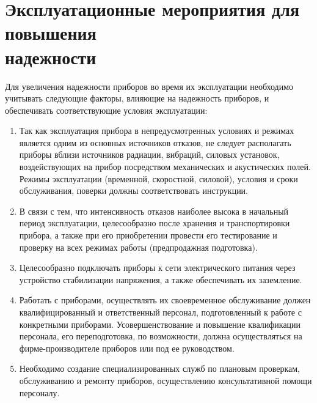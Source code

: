 \section[Эксплуатационные мероприятия для повышения надежности]{Эксплуатационные мероприятия для повышения \\надежности}
Для увеличения надежности приборов во время их эксплуатации необходимо учитывать следующие факторы, влияющие на надежность приборов, и обеспечивать соответствующие условия эксплуатации:
\begin{enumerate}
\item Так как эксплуатация прибора в непредусмотренных условиях и режимах является одним из основных источников отказов, не следует располагать приборы вблизи источников радиации, вибраций, силовых установок, воздействующих на прибор посредством механических и акустических полей. Режимы эксплуатации (временной, скоростной, силовой), условия и сроки обслуживания, поверки должны соответствовать инструкции.
\item В связи с тем, что интенсивность отказов наиболее высока в начальный период эксплуатации, целесообразно после хранения и транспортировки прибора, а также при его приобретении провести его тестирование и проверку на всех режимах работы (предпродажная подготовка).
\item Целесообразно подключать приборы к сети электрического питания через устройство стабилизации напряжения, а также обеспечивать их заземление.
\item Работать с приборами, осуществлять их своевременное обслуживание должен квалифицированный и ответственный персонал, подготовленный к работе с конкретными приборами. Усовершенствование и повышение квалификации персонала, его переподготовка, по возможности, должна осуществляться на фирме-производителе приборов или под ее руководством.
\item Необходимо создание специализированных служб по плановым проверкам, обслуживанию и ремонту приборов, осуществлению консультативной помощи персоналу.
\end{enumerate}